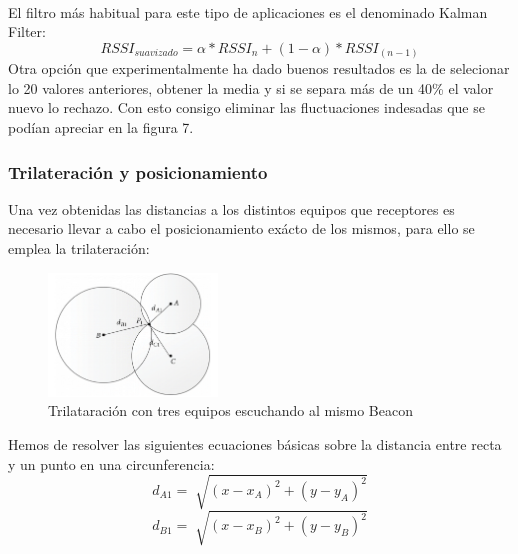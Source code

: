 \documentclass[a4paper ,12pt, onecolumn]{article}
\begin{document}
            \paragraph{}
            El filtro más habitual para este tipo de aplicaciones es el denominado Kalman Filter:
            \begin{equation}
                RSSI_{suavizado} = \alpha * RSSI_{n} + (1-\alpha) * RSSI_{(n-1)}
            \end{equation}
            Otra opción que experimentalmente ha dado buenos resultados es la de selecionar lo 20 valores anteriores,
            obtener la media y si se separa más de un 40\% el valor nuevo lo rechazo. Con esto consigo eliminar las 
            fluctuaciones indesadas que se podían apreciar en la figura 7.
        \subsubsection{Trilateración y posicionamiento}
            Una vez obtenidas las distancias a los distintos equipos que receptores es necesario llevar a cabo el
            posicionamiento exácto de los mismos, para ello se emplea la trilateración:
            \begin{center}
                \begin{figure}[h]
                    \centering
                    \includegraphics[width=0.4\textwidth]{trilateration_circle.png}
                    \caption{Trilataración con tres equipos escuchando al mismo Beacon}
                    \label{fig:mesh7}
                \end{figure}
            \end{center}
                Hemos de resolver las siguientes ecuaciones básicas sobre la distancia entre recta y un punto en 
                una circunferencia:
                \begin{equation}
                    d_{A1}= \sqrt[]{(x-x_A)^2+(y-y_A)^2}
                \end{equation}
                \begin{equation}
                d_{B1}= \sqrt[]{(x-x_B)^2+(y-y_B)^2}
                \end{equation}
\end{document}
